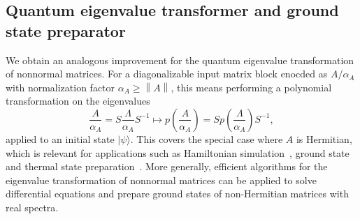 \documentclass[letterpaper,onecolumn,11pt,accepted=2026-02-14]{quantumarticle}
\newcommand{\norm}[1]{\left\lVert#1\right\rVert}
\theoremstyle{remark}
\theoremstyle{plain}
\newcommand{\ket}[1]{|#1\rangle}
\begin{document}
\subsection{Quantum eigenvalue transformer and ground state preparator}
\label{sec:precond_transform}
We obtain an analogous improvement for the quantum eigenvalue transformation of nonnormal matrices. For a diagonalizable input matrix block enocded as $A/\alpha_A$ with normalization factor $\alpha_A\geq\norm{A}$, this means performing a polynomial transformation on the eigenvalues 
\begin{equation}
\label{eq:qevt}
    \frac{A}{\alpha_A}=S\frac{\Lambda}{\alpha_A} S^{-1}\mapsto
    p\left(\frac{A}{\alpha_A}\right)=Sp\left(\frac{\Lambda}{\alpha_A}\right)S^{-1},
\end{equation}
applied to an initial state $\ket{\psi}$.
This covers the special case where $A$ is Hermitian, which is relevant for applications such as Hamiltonian simulation~\cite{Low2016Qubitization}, ground state~\cite{Lin2020nearoptimalground} and thermal state preparation~\cite{Gilyen2018singular}.
More generally, efficient algorithms for the eigenvalue transformation of nonnormal matrices can be applied to solve differential equations and prepare ground states of non-Hermitian matrices with real spectra.
\end{document}
